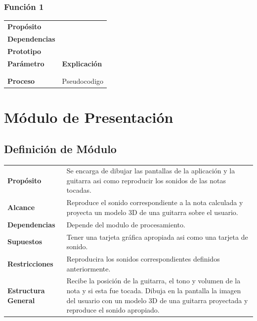\documentclass[a4paper,10pt]{article}
\begin{document}
\subsubsection{Función 1}
\begin{tabularx}{\textwidth}{p{25mm} X}
        \textbf{Propósito} & \\
        \textbf{Dependencias} & \\
        \textbf{Prototipo} & \\
        \textbf{Parámetro} & \textbf{Explicación} \\
        \begin{tabular}{p{2cm} l}
                Parámetro 1 & \\
        \end{tabular}

        \textbf{Retorno} & \\
        \textbf{Proceso} & Pseudocodigo \\
\end{tabularx}


\section{Módulo de Presentación}
\label{sec:presentacion}
\subsection{Definición de Módulo}
\begin{tabularx}{\textwidth}{p{25mm} X}
        \textbf{Propósito} & Se encarga de dibujar las pantallas de la aplicación y la guitarra asi como reproducir los sonidos de las notas tocadas.\\
        \textbf{Alcance} & Reproduce el sonido correspondiente a la nota calculada y proyecta un modelo 3D de una guitarra sobre el usuario.\\
        \textbf{Dependencias} & Depende del modulo de procesamiento.\\
        \textbf{Supuestos} & Tener una tarjeta gráfica apropiada asi como una tarjeta de sonido.\\
        \textbf{Restricciones} & Reproducira los sonidos correspondientes definidos anteriormente.\\
        \textbf{Estructura General} & Recibe la posición de la guitarra, el tono y volumen de la nota y si esta fue tocada. Dibuja en la pantalla la imagen del usuario con un modelo 3D de una guitarra proyectada y reproduce el sonido apropiado.\\
\end{tabularx}
\end{document}
